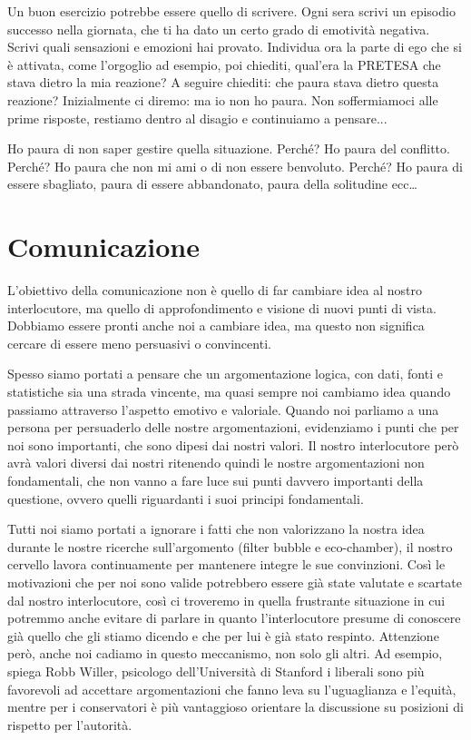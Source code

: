 \documentclass[12pt]{book} %
\begin{document}
Un buon esercizio potrebbe essere quello di scrivere. Ogni sera scrivi un episodio successo nella giornata, che ti ha
dato un certo grado di emotività negativa. Scrivi quali sensazioni e emozioni hai provato. Individua ora la parte di
ego che si è attivata, come l'orgoglio ad esempio, poi chiediti, qual'era la PRETESA che stava dietro la mia reazione?
A seguire chiediti: che paura stava dietro questa reazione? Inizialmente ci diremo: ma io non ho paura. Non
soffermiamoci alle prime risposte, restiamo dentro al disagio e continuiamo a pensare... 

Ho paura di non saper gestire quella situazione.\newline
Perché?\newline
Ho paura del conflitto. \newline
Perché? \newline
Ho paura che non mi ami o di non essere benvoluto.\newline
Perché? \newline
Ho paura di essere sbagliato, paura di essere abbandonato, paura della solitudine ecc…

\clearpage\section{Comunicazione}
L'obiettivo della comunicazione non è quello di far cambiare idea al nostro interlocutore, ma
quello di approfondimento e visione di nuovi punti di vista. Dobbiamo essere pronti anche noi a cambiare idea, ma
questo non significa cercare di essere meno persuasivi o convincenti.

Spesso siamo portati a pensare che un argomentazione logica, con dati, fonti e statistiche sia una strada vincente, ma
quasi sempre noi cambiamo idea quando passiamo attraverso l'aspetto emotivo e valoriale. Quando
noi parliamo a una persona per persuaderlo delle nostre argomentazioni, evidenziamo i punti che per noi sono
importanti, che sono dipesi dai nostri valori. Il nostro interlocutore però avrà valori diversi dai nostri ritenendo
quindi le nostre argomentazioni non fondamentali, che non vanno a fare luce sui punti davvero importanti della
questione, ovvero quelli riguardanti i suoi principi fondamentali.


\bigskip

Tutti noi siamo portati a ignorare i fatti che non valorizzano la nostra idea durante le nostre ricerche
sull'argomento (filter bubble e eco-chamber), il nostro cervello lavora continuamente per
mantenere integre le sue convinzioni. Così le motivazioni che per noi sono valide potrebbero essere già state valutate
e scartate dal nostro interlocutore, così ci troveremo in quella frustrante situazione in cui potremmo anche evitare di
parlare in quanto l'interlocutore presume di conoscere già quello che gli stiamo dicendo e che per
lui è già stato respinto. Attenzione però, anche noi cadiamo in questo meccanismo, non solo gli altri. Ad esempio,
spiega Robb Willer, psicologo dell'Università di Stanford i liberali sono più favorevoli ad accettare argomentazioni
che fanno leva su l'uguaglianza e l'equità, mentre per i conservatori è più vantaggioso orientare la discussione su
posizioni di rispetto per l'autorità.
\end{document}
